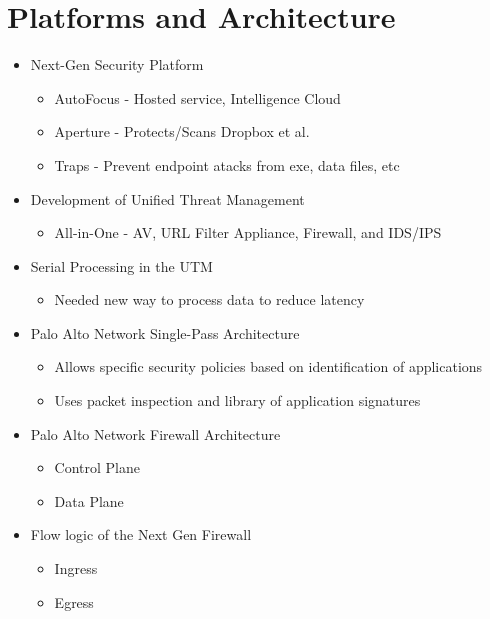 

%

\setcounter{section}{0}

\section{Platforms and Architecture}
\begin{itemize}
    \item Next-Gen Security Platform
        \begin{itemize}
            \item AutoFocus - Hosted service, Intelligence Cloud
            \item Aperture - Protects/Scans Dropbox et al.
            \item Traps - Prevent endpoint atacks from exe, data files, etc
        \end{itemize}
    \item Development of Unified Threat Management
        \begin{itemize}
            \item All-in-One - AV, URL Filter Appliance, Firewall, and IDS/IPS
        \end{itemize}
    \item Serial Processing in the UTM
        \begin{itemize}
            \item Needed new way to process data to reduce latency
        \end{itemize}
    \item Palo Alto Network Single-Pass Architecture
        \begin{itemize}
            \item Allows specific security policies based on identification of applications
            \item Uses packet inspection and library of application signatures
        \end{itemize}
    \item Palo Alto Network Firewall Architecture
        \begin{itemize}
            \item Control Plane
            \item Data Plane
        \end{itemize}
    \item Flow logic of the Next Gen Firewall
        \begin{itemize}
            \item Ingress
            \item Egress
        \end{itemize}
\end{itemize}


